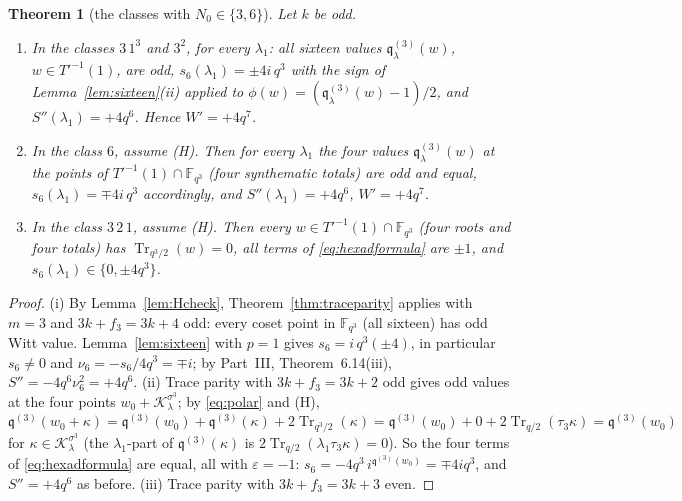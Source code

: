 \documentclass[12pt,a4paper]{amsart}
\newtheorem{theorem}{Theorem}[section]
\theoremstyle{definition}
\newcommand{\F}{\mathbb{F}}
\newcommand{\Tr}{\operatorname{Tr}}
\newcommand{\eps}{\varepsilon}
\newcommand{\Kk}{\mathcal{K}}
\newcommand{\qq}{\mathfrak{q}}
\newcommand{\Spp}{S''}
\begin{document}
\begin{theorem}[the classes with $N_0\in\{3,6\}$]\label{thm:N0div6}
Let $k$ be odd.
\begin{enumerate}[label=\textup{(\roman*)},leftmargin=2em]
\item In the classes $3\,1^3$ and $3^2$, for every $\lambda_1$: all sixteen values $\qq^{(3)}_\lambda(w)$, $w\in T'^{-1}(1)$, are odd, $s_6(\lambda_1)=\pm4i\,q^3$ with the sign of Lemma~\ref{lem:sixteen}\textup{(ii)} applied to $\phi(w)=(\qq^{(3)}_\lambda(w)-1)/2$, and $\Spp(\lambda_1)=+4q^6$. Hence $W'=+4q^7$.
\item In the class $6$, assume \textup{(H)}. Then for every $\lambda_1$ the four values $\qq^{(3)}_\lambda(w)$ at the points of $T'^{-1}(1)\cap\F_{q^3}$ (four synthematic totals) are odd and equal, $s_6(\lambda_1)=\mp4i\,q^3$ accordingly, and $\Spp(\lambda_1)=+4q^6$, $W'=+4q^7$.
\item In the class $3\,2\,1$, assume \textup{(H)}. Then every $w\in T'^{-1}(1)\cap\F_{q^3}$ (four roots and four totals) has $\Tr_{q^3/2}(w)=0$, all terms of \eqref{eq:hexadformula} are $\pm1$, and $s_6(\lambda_1)\in\{0,\pm4q^3\}$.
\end{enumerate}
\end{theorem}
\begin{proof}
(i) By Lemma~\ref{lem:Hcheck}, Theorem~\ref{thm:traceparity} applies with $m=3$ and $3k+f_3=3k+4$ odd: every coset point in $\F_{q^3}$ (all sixteen) has odd Witt value. Lemma~\ref{lem:sixteen} with $p=1$ gives $s_6=i\,q^3(\pm4)$, in particular $s_6\ne0$ and $\nu_6=-s_6/4q^3=\mp i$; by Part~III, Theorem~6.14(iii), $\Spp=-4q^6\nu_6^2=+4q^6$. (ii) Trace parity with $3k+f_3=3k+2$ odd gives odd values at the four points $w_0+\Kk_\lambda^{\sigma^3}$; by \eqref{eq:polar} and (H), $\qq^{(3)}(w_0+\kappa)=\qq^{(3)}(w_0)+\qq^{(3)}(\kappa)+2\Tr_{q^3/2}(\kappa)=\qq^{(3)}(w_0)+0+2\Tr_{q/2}(\tau_3\kappa)=\qq^{(3)}(w_0)$ for $\kappa\in\Kk_\lambda^{\sigma^3}$ (the $\lambda_1$-part of $\qq^{(3)}(\kappa)$ is $2\Tr_{q/2}(\lambda_1\tau_3\kappa)=0$). So the four terms of \eqref{eq:hexadformula} are equal, all with $\eps=-1$: $s_6=-4q^3\,i^{\qq^{(3)}(w_0)}=\mp4iq^3$, and $\Spp=+4q^6$ as before. (iii) Trace parity with $3k+f_3=3k+3$ even.
\end{proof}
\end{document}
